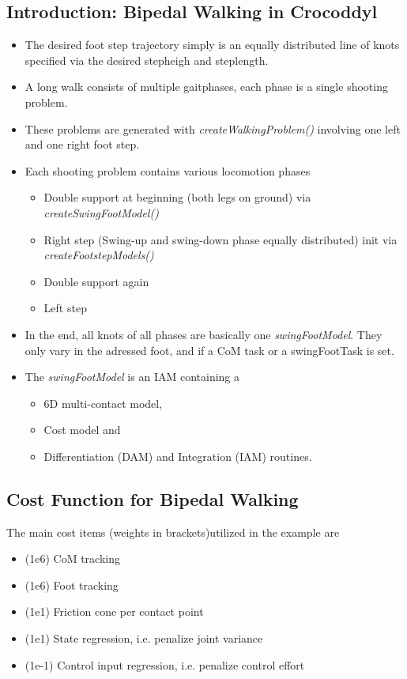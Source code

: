 \subsection{Introduction: Bipedal Walking in Crocoddyl}
\begin{itemize}
\item The desired foot step trajectory simply is an equally distributed line of knots specified via the desired stepheigh and steplength. 
\item A long walk consists of multiple gaitphases, each phase is a single shooting problem.
\item These problems are generated with \textit{createWalkingProblem()} involving one left and one right foot step.
\item Each shooting problem contains various locomotion phases
	\begin{itemize}
	\item Double support at beginning (both legs on ground) via \textit{createSwingFootModel()}
	\item Right step (Swing-up and swing-down phase equally distributed) init via    	\textit{createFootstepModels()}
	\item Double support again
	\item Left step
	\end{itemize}	
\item In the end, all knots of all phases are basically one \textit{swingFootModel}. They only vary in the adressed foot, and if a CoM task or a swingFootTask is set.
\item The \textit{swingFootModel} is an IAM containing a 
	\begin{itemize}
	\item 6D multi-contact model,
	\item Cost model and
	\item Differentiation (DAM) and Integration (IAM) routines.
	\end{itemize}
\end{itemize}

\subsection{Cost Function for Bipedal Walking}
The main cost items (weights in brackets)utilized in the example are 
\begin{itemize}
\item (1e6) CoM tracking
\item (1e6) Foot tracking
\item (1e1) Friction cone per contact point
\item (1e1) State regression, i.e. penalize joint variance
\item (1e-1) Control input regression, i.e. penalize control effort
\end{itemize}

